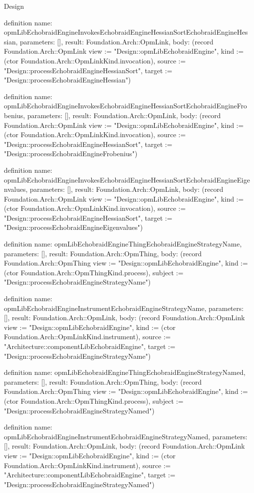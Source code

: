 \begin{lexlean}{Design}
\begin{semanticmodule}
definition{
  name: opmLibEchobraidEngineInvokesEchobraidEngineHessianSortEchobraidEngineHessian,
  parameters: [],
  result: Foundation.Arch::OpmLink,
  body: (record Foundation.Arch::OpmLink {view := "Design::opmLibEchobraidEngine", kind := (ctor Foundation.Arch::OpmLinkKind.invocation), source := "Design::processEchobraidEngineHessianSort", target := "Design::processEchobraidEngineHessian"})
}

definition{
  name: opmLibEchobraidEngineInvokesEchobraidEngineHessianSortEchobraidEngineFrobenius,
  parameters: [],
  result: Foundation.Arch::OpmLink,
  body: (record Foundation.Arch::OpmLink {view := "Design::opmLibEchobraidEngine", kind := (ctor Foundation.Arch::OpmLinkKind.invocation), source := "Design::processEchobraidEngineHessianSort", target := "Design::processEchobraidEngineFrobenius"})
}

definition{
  name: opmLibEchobraidEngineInvokesEchobraidEngineHessianSortEchobraidEngineEigenvalues,
  parameters: [],
  result: Foundation.Arch::OpmLink,
  body: (record Foundation.Arch::OpmLink {view := "Design::opmLibEchobraidEngine", kind := (ctor Foundation.Arch::OpmLinkKind.invocation), source := "Design::processEchobraidEngineHessianSort", target := "Design::processEchobraidEngineEigenvalues"})
}

definition{
  name: opmLibEchobraidEngineThingEchobraidEngineStrategyName,
  parameters: [],
  result: Foundation.Arch::OpmThing,
  body: (record Foundation.Arch::OpmThing {view := "Design::opmLibEchobraidEngine", kind := (ctor Foundation.Arch::OpmThingKind.process), subject := "Design::processEchobraidEngineStrategyName"})
}

definition{
  name: opmLibEchobraidEngineInstrumentEchobraidEngineStrategyName,
  parameters: [],
  result: Foundation.Arch::OpmLink,
  body: (record Foundation.Arch::OpmLink {view := "Design::opmLibEchobraidEngine", kind := (ctor Foundation.Arch::OpmLinkKind.instrument), source := "Architecture::componentLibEchobraidEngine", target := "Design::processEchobraidEngineStrategyName"})
}

definition{
  name: opmLibEchobraidEngineThingEchobraidEngineStrategyNamed,
  parameters: [],
  result: Foundation.Arch::OpmThing,
  body: (record Foundation.Arch::OpmThing {view := "Design::opmLibEchobraidEngine", kind := (ctor Foundation.Arch::OpmThingKind.process), subject := "Design::processEchobraidEngineStrategyNamed"})
}

definition{
  name: opmLibEchobraidEngineInstrumentEchobraidEngineStrategyNamed,
  parameters: [],
  result: Foundation.Arch::OpmLink,
  body: (record Foundation.Arch::OpmLink {view := "Design::opmLibEchobraidEngine", kind := (ctor Foundation.Arch::OpmLinkKind.instrument), source := "Architecture::componentLibEchobraidEngine", target := "Design::processEchobraidEngineStrategyNamed"})
}


\end{semanticmodule}
\end{lexlean}
